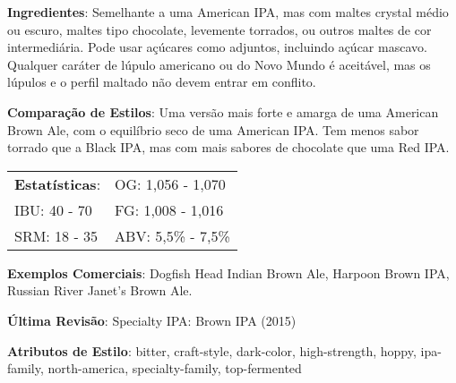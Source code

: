 \textbf{Ingredientes}: Semelhante a uma American IPA, mas com maltes crystal médio ou escuro, maltes tipo chocolate, levemente torrados, ou outros maltes de cor intermediária. Pode usar açúcares como adjuntos, incluindo açúcar mascavo. Qualquer caráter de lúpulo americano ou do Novo Mundo é aceitável, mas os lúpulos e o perfil maltado não devem entrar em conflito.

\textbf{Comparação de Estilos}: Uma versão mais forte e amarga de uma American Brown Ale, com o equilíbrio seco de uma American IPA. Tem menos sabor torrado que a Black IPA, mas com mais sabores de chocolate que uma Red IPA.

\begin{tabular}{@{}p{35mm}p{35mm}@{}}
  \textbf{Estatísticas}: & OG: 1,056 - 1,070 \\
  IBU: 40 - 70  & FG: 1,008 - 1,016 \\
  SRM: 18 - 35  & ABV: 5,5\% - 7,5\%
\end{tabular}

\textbf{Exemplos Comerciais}: Dogfish Head Indian Brown Ale, Harpoon Brown IPA, Russian River Janet’s Brown Ale.

\textbf{Última Revisão}: Specialty IPA: Brown IPA (2015)

\textbf{Atributos de Estilo}: bitter, craft-style, dark-color, high-strength, hoppy, ipa-family, north-america, specialty-family, top-fermented
